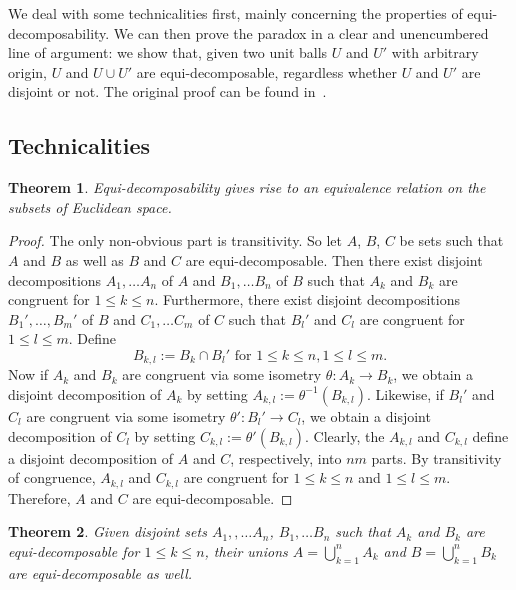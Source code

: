 \documentclass[12pt]{article}
\newcommand{\Bigcup}{\bigcup\limits}
\begin{document}
\newtheorem{thm}{Theorem}
We deal with some technicalities first, mainly concerning the
properties of equi-decomposability. We can then prove the paradox in a
clear and unencumbered line of argument: we show that, given two unit
balls $U$ and $U'$ with arbitrary origin, $U$ and $U\cup U'$ are
equi-decomposable, regardless whether $U$ and $U'$ are disjoint or
not. The original proof can be found in~\cite{BT}.

\subsection*{Technicalities}
\begin{thm}
\label{theo3}
Equi-decomposability gives rise to an equivalence relation on the
subsets of Euclidean space.
\end{thm}
\smallskip

\begin{proof}
The only non-obvious part is transitivity. So let $A$, $B$, $C$ be
sets such that $A$ and $B$ as well as $B$ and $C$ are
equi-decomposable. Then there exist disjoint decompositions
$A_1,\ldots A_n$ of $A$ and $B_1,\ldots B_n$ of $B$ such that $A_k$
and $B_k$ are congruent for $1\leq k\leq n$. Furthermore, there exist
disjoint decompositions $B_1',\ldots,B_m'$ of $B$ and $C_1,\ldots C_m$
of $C$ such that $B_l'$ and $C_l$ are congruent for $1\leq l\leq
m$. Define
\begin{equation*}
B_{k,l}:=B_k\cap B_l'\text{ for }1\leq k\leq n, 1\leq l\leq m.
\end{equation*}
Now if $A_k$ and $B_k$ are congruent via some isometry $\theta\colon
A_k\to B_k$, we obtain a disjoint decomposition of $A_k$ by setting
$A_{k,l}:=\theta^{-1}(B_{k,l})$. Likewise, if $B_l'$ and $C_l$ are
congruent via some isometry $\theta'\colon B_l'\to C_l$, we obtain a
disjoint decomposition of $C_l$ by setting
$C_{k,l}:=\theta'(B_{k,l})$. Clearly, the $A_{k,l}$ and $C_{k,l}$
define a disjoint decomposition of $A$ and $C$, respectively, into
$nm$ parts. By transitivity of congruence, $A_{k,l}$ and $C_{k,l}$ are
congruent for $1\leq k\leq n$ and $1\leq l\leq m$. Therefore, $A$ and
$C$ are equi-decomposable.
\end{proof}
\medskip

\begin{thm}
\label{theo4}
Given disjoint sets $A_1,,\ldots A_n$, $B_1,\ldots B_n$ such that
$A_k$ and $B_k$ are equi-decomposable for $1\leq k\leq n$, their
unions $A=\Bigcup_{k=1}^nA_k$ and $B=\Bigcup_{k=1}^nB_k$ are
equi-decomposable as well.
\end{thm}
\smallskip
\end{document}
